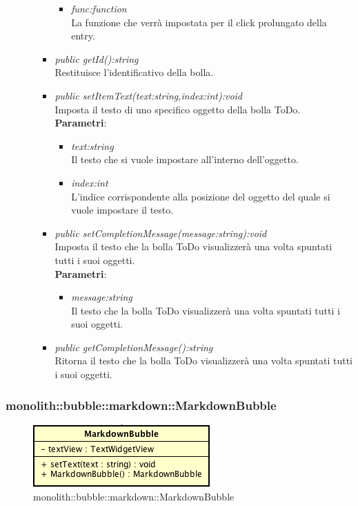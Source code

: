 \begin{itemize}
\begin{itemize}
\begin{itemize}
\begin{itemize}
		\item \textit{func:function}\\
		La funzione che verrà impostata per il click prolungato della entry.
		\end{itemize}
\item \textit{public getId():string}\\
Restituisce l'identificativo della bolla.
\item \textit{public setItemText(text:string,index:int):void}\\
	Imposta il testo di uno specifico oggetto della bolla ToDo.
		\\ \textbf{Parametri}: \begin{itemize}
		\item \textit{text:string}\\
		Il testo che si vuole impostare all'interno dell'oggetto.
		\item \textit{index:int}\\
		L'indice corrispondente alla posizione del oggetto del quale si vuole impostare il testo.
		\end{itemize}
\item \textit{public setCompletionMessage(message:string):void}\\
Imposta il testo che la bolla ToDo visualizzerà una volta spuntati tutti i suoi oggetti.
	\\ \textbf{Parametri}: \begin{itemize}
		\item \textit{message:string}\\
		Il testo che la bolla ToDo visualizzerà una volta spuntati tutti i suoi oggetti.
	\end{itemize}
\item \textit{public getCompletionMessage():string}\\
Ritorna il testo che la bolla ToDo visualizzerà una volta spuntati tutti i suoi oggetti.

\end{itemize}
\end{itemize}
\end{itemize}

\subsubsection{monolith::bubble::markdown::MarkdownBubble}

\label{monolith::bubble::markdown::MarkdownBubble}
\begin{figure}[H]
	\centering
	\includegraphics[scale=0.5]{Sezioni/SottosezioniST/img/MarkdownBubble.png}
	\caption{monolith::bubble::markdown::MarkdownBubble}
\end{figure}

